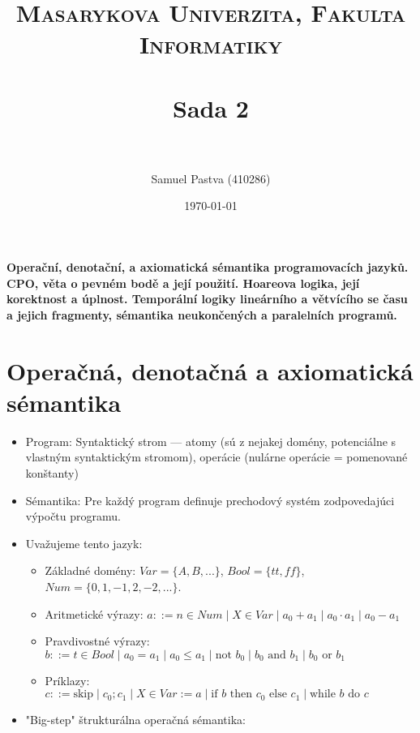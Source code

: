 \documentclass[paper=a4, fontsize=11pt]{scrartcl} %
\title{	
	\normalfont \normalsize 
	\textsc{Masarykova Univerzita, Fakulta Informatiky} \\ [25pt] %
	\horrule{0.5pt} \\[0.4cm] %
	\huge Sada 2 \\ %
	\horrule{2pt} \\[0.5cm] %
}
\author{Samuel Pastva (410286)} %
\date{\normalsize\today} %
\numberwithin{equation}{section} %
\numberwithin{figure}{section} %
\numberwithin{table}{section} %
\begin{document}
	
	\textbf{Operační, denotační, a axiomatická sémantika programovacích jazyků. CPO, věta o pevném bodě a její použití. Hoareova logika, její korektnost a úplnost. Temporální logiky  lineárního a větvícího se času a jejich fragmenty, sémantika neukončených a paralelních programů.}
	
	\section{Operačná, denotačná a axiomatická sémantika}
	
	\begin{itemize}
		\item Program: Syntaktický strom — atomy (sú z nejakej domény, potenciálne s vlastným syntaktickým stromom), operácie (nulárne operácie = pomenované konštanty)
		
		\item Sémantika: Pre každý program definuje prechodový systém zodpovedajúci výpočtu programu.
		
		\item Uvažujeme tento jazyk:
		
		\begin{itemize}
			\item Základné domény: $Var = \{A, B, ... \}$, $Bool = \{tt, ff \}$, $Num = \{0, 1, -1, 2, -2, ... \}$.
			\item Aritmetické výrazy: $a ::= n \in Num \mid X \in Var \mid a_0 + a_1 \mid a_0 \cdot a_1 \mid a_0 - a_1$
			\item Pravdivostné výrazy: $b ::= t \in Bool \mid a_0 = a_1 \mid a_0 \leq a_1 \mid \text{not } b_0 \mid b_0 \text{ and } b_1 \mid b_0 \text{ or } b_1$
			\item Príklazy: $c ::= \text{skip} \mid c_0;c_1 \mid X \in Var := a \mid \text{if } b \text{ then } c_0 \text{ else } c_1 \mid \text{while } b \text{ do } c$
		\end{itemize}
	
		\item "Big-step" štrukturálna operačná sémantika:
		

\end{itemize}
\end{document}
